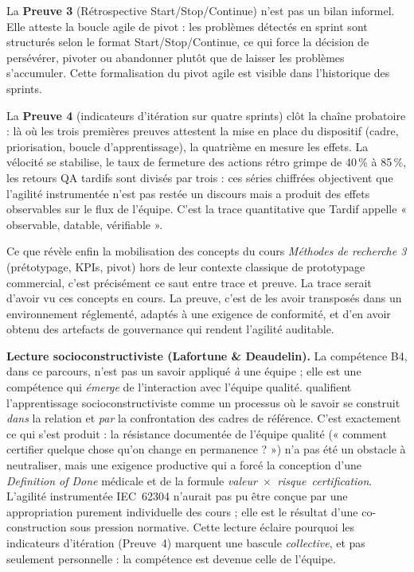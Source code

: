 La \textbf{Preuve 3} (Rétrospective Start/Stop/Continue) n'est pas un bilan informel. Elle atteste la boucle agile de pivot : les problèmes détectés en sprint sont structurés selon le format Start/Stop/Continue, ce qui force la décision de persévérer, pivoter ou abandonner plutôt que de laisser les problèmes s'accumuler. Cette formalisation du pivot agile est visible dans l'historique des sprints.

La \textbf{Preuve 4} (indicateurs d'itération sur quatre sprints) clôt la chaîne probatoire : là où les trois premières preuves attestent la mise en place du dispositif (cadre, priorisation, boucle d'apprentissage), la quatrième en mesure les effets. La vélocité se stabilise, le taux de fermeture des actions rétro grimpe de 40\,\% à 85\,\%, les retours QA tardifs sont divisés par trois : ces séries chiffrées objectivent que l'agilité instrumentée n'est pas restée un discours mais a produit des effets observables sur le flux de l'équipe. C'est la trace quantitative que Tardif appelle « observable, datable, vérifiable ».

Ce que révèle enfin la mobilisation des concepts du cours \textit{Méthodes de recherche 3} (prétotypage, KPIs, pivot) hors de leur contexte classique de prototypage commercial, c'est précisément ce saut entre trace et preuve. La trace serait d'avoir vu ces concepts en cours. La preuve, c'est de les avoir transposés dans un environnement réglementé, adaptés à une exigence de conformité, et d'en avoir obtenu des artefacts de gouvernance qui rendent l'agilité auditable.

\medskip

\textbf{Lecture socioconstructiviste (Lafortune \& Deaudelin).}
La compétence B4, dans ce parcours, n'est pas un savoir appliqué \emph{à} une équipe ; elle est une compétence qui \emph{émerge} de l'interaction avec l'équipe qualité. \citet{lafortune2001} qualifient l'apprentissage socioconstructiviste comme un processus où le savoir se construit \emph{dans} la relation et \emph{par} la confrontation des cadres de référence. C'est exactement ce qui s'est produit : la résistance documentée de l'équipe qualité (« comment certifier quelque chose qu'on change en permanence ? ») n'a pas été un obstacle à neutraliser, mais une exigence productive qui a forcé la conception d'une \textit{Definition of Done} médicale et de la formule \emph{valeur~$\times$~risque~certification}. L'agilité instrumentée IEC~62304 n'aurait pas pu être conçue par une appropriation purement individuelle des cours ; elle est le résultat d'une co-construction sous pression normative. Cette lecture éclaire pourquoi les indicateurs d'itération (Preuve~4) marquent une bascule \emph{collective}, et pas seulement personnelle : la compétence est devenue celle de l'équipe.


